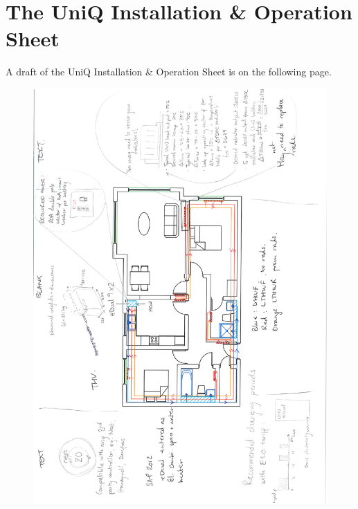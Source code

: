 
\chapter{The UniQ Installation \& Operation Sheet} %

\label{App:ino} %


A draft of the UniQ Installation \& Operation Sheet is on the following page.

\begin{figure}
	\centering
	\includegraphics[height=\textheight]{Appendices/InOSheetSketch.pdf}
\end{figure}